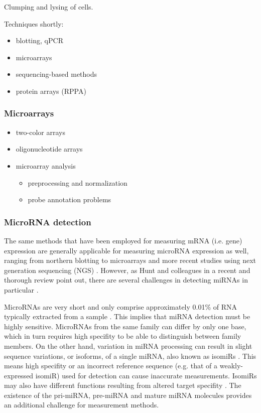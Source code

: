 Clumping and lysing of cells.

Techniques shortly:
\begin{itemize}
  \item blotting, qPCR
  \item microarrays
  \item sequencing-based methods
  \item protein arrays (RPPA)
\end{itemize}





\subsubsection{Microarrays}

\begin{itemize}
  \item two-color arrays
  \item oligonucleotide arrays
  \item microarray analysis
  \begin{itemize}
    \item preprocessing and normalization
    \item probe annotation problems
  \end{itemize}
\end{itemize}



\subsubsection{MicroRNA detection}

The same methods that have been employed for measuring mRNA (i.e. gene)
expression are generally applicable for measuring microRNA expression as well,
ranging from northern blotting to microarrays and more recent studies using next
generation sequencing (NGS) \citep{Huang2011}. However, as Hunt and colleagues
in a recent and thorough review point out, there are several challenges in
detecting miRNAs in particular \citep{Hunt2015}.

MicroRNAs are very short and only comprise approximately 0.01\% of RNA
typically extracted from a sample \citep{Dong2013}. This implies that miRNA
detection must be highly sensitive. MicroRNAs from the same family can differ
by only one base, which in turn requires high specifity to be able to
distinguish between family members. On the other hand, variation in miRNA
processing can result in slight sequence variations, or isoforms, of a single
miRNA, also known as isomiRs \citep{StaregaRoslan2011,Lee2010}. This means
high specifity or an incorrect reference sequence (e.g. that of a 
weakly-expressed isomiR) used for detection can cause inaccurate measurements.
IsomiRs may also have different functions resulting from altered target
specifity \citep{Chugh2012}. The existence of the pri-miRNA, pre-miRNA and
mature miRNA molecules provides an additional challenge for measurement
methods.

